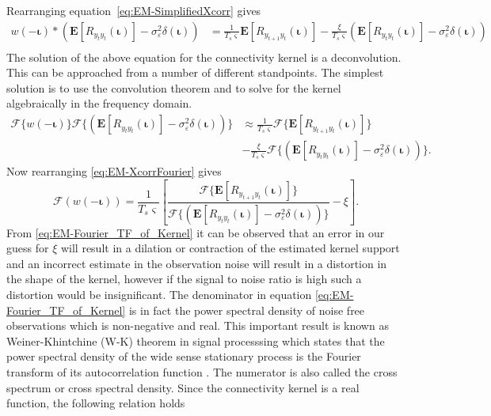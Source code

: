 \documentclass[]{article}
\begin{document}
Rearranging equation~\eqref{eq:EM-SimplifiedXcorr} gives
\begin{align}
	 w(-\boldsymbol\iota) \ast  (\mathbf{E}\left[R_{y_ty_t}(\boldsymbol\iota)\right] - \sigma_{\varepsilon}^2 \delta(\boldsymbol\iota))&=\frac{1}{T_s\varsigma}\mathbf{E}[R_{y_{t+1}y_t}(\boldsymbol{\iota})]-\frac{\xi}{T_s\varsigma}\left(\mathbf{E}[ R_{y_ty_t}(\boldsymbol{\iota})] - \sigma_{\varepsilon}^2 \delta(\boldsymbol{\iota})\right)\nonumber \\
\end{align}
The solution of the above equation for the connectivity kernel is a deconvolution. This can be approached from a number of different standpoints. The simplest solution is to use the convolution theorem and to solve for the kernel algebraically in the frequency domain.
\begin{align}\label{eq:EM-XcorrFourier}
	\mathcal{F}\{w(-\boldsymbol\iota)\} \mathcal{F}\{(\mathbf{E}\left[R_{y_ty_t}(\boldsymbol\iota)\right] - \sigma_{\varepsilon}^2 \delta(\boldsymbol\iota))\} &\approx \frac{1}{T_s\varsigma}\mathcal{F}\{\mathbf{E}[R_{y_{t+1}y_t}(\boldsymbol{\iota})]\}\nonumber \\
&-\frac{\xi}{T_s\varsigma}\mathcal{F} \{\left(\mathbf{E}[ R_{y_ty_t}(\boldsymbol{\iota})] - \sigma_{\varepsilon}^2 \delta(\boldsymbol{\iota})\right)\}.
\end{align}
Now rearranging \eqref{eq:EM-XcorrFourier} gives
\begin{equation}\label{eq:EM-Fourier_TF_of_Kernel}
	\mathcal{F}\left(w(-\boldsymbol\iota)\right) = \frac{1}{T_s\varsigma }\left[\frac{\mathcal{F}\{\mathbf{E}[R_{y_{t+1}y_t}(\boldsymbol{\iota})]\}}{\mathcal{F}\{(\mathbf{E}\left[R_{y_ty_t}(\boldsymbol\iota)\right] - \sigma_{\varepsilon}^2 \delta(\boldsymbol\iota))\}}-\xi\right].
\end{equation}
From \eqref{eq:EM-Fourier_TF_of_Kernel} it can be observed that an error in our guess for $\xi$ will result in a dilation or contraction of the estimated kernel support and an incorrect estimate in the observation noise will result in a distortion in the shape of the kernel, however if the signal to noise ratio is high such a distortion would be insignificant. The denominator in equation \eqref{eq:EM-Fourier_TF_of_Kernel} is in fact the power spectral density of noise free observations which is non-negative and real. This important result is known as Weiner-Khintchine (W-K) theorem in signal processsing which states that the power spectral density of the wide sense stationary process is the Fourier transform of its autocorrelation function \cite{Ricker2003}. The numerator is also called the cross spectrum or cross spectral density. Since the connectivity kernel is a real function, the following relation holds \cite{Bracewell2000}
\end{document}
